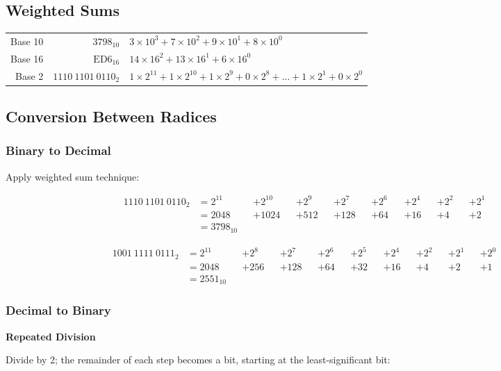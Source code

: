 \documentclass{article}
\begin{document}
\subsection{Weighted Sums}

\begin{tabular}{rrl}
Base 10 & $3798_{10}$           & $3 \times 10^3 + 7 \times 10^2 + 9 \times 10^1 + 8 \times 10^0$ \\
Base 16 & $\mathrm{ED6}_{16}$   & $14 \times 16^2 + 13 \times 16^1 + 6 \times 16^0$ \\
Base 2  & $1110\ 1101\ 0110_2$  & $1 \times 2^{11} + 1 \times 2^{10} + 1 \times 2^9 + 0 \times 2^8 + \dots + 1 \times 2^1 + 0 \times 2^0$
\end{tabular}

\subsection{Conversion Between Radices}

\subsubsection{Binary to Decimal}

Apply weighted sum technique:

\begin{align*}
1110\ 1101\ 0110_2 &= 2^{11} &&+ 2^{10} &&+ 2^9 &&+ 2^7 &&+ 2^6 &&+ 2^4 &&+ 2^2 &&+ 2^1 \\
    &= 2048 &&+ 1024 &&+ 512 &&+ 128 &&+ 64 &&+ 16 &&+ 4 &&+ 2 \\
    &= 3798_{10}
\end{align*}

\begin{align*}
1001\ 1111\ 0111_2 &= 2^{11} &&+ 2^8 &&+ 2^7 &&+ 2^6 &&+ 2^5 &&+ 2^4 &&+ 2^2 &&+ 2^1 &&+ 2^0\\
    &= 2048 &&+ 256 &&+ 128 &&+ 64 &&+ 32 &&+ 16 &&+ 4 &&+ 2 &&+ 1 \\
    &= 2551_{10}
\end{align*}

\subsubsection{Decimal to Binary}

\textbf{Repeated Division}

Divide by 2; the remainder of each step becomes a bit, starting at the
least-significant bit:
\end{document}
